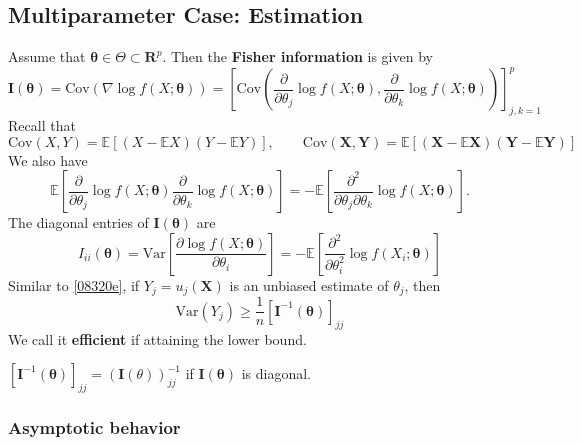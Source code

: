 \subsection{Multiparameter Case: Estimation}

Assume that $\boldsymbol{\theta}\in\Theta \subset \mathbf{R}^{p}$. Then the \textbf{Fisher information} is given by
\[
\mathbf{I}(\boldsymbol{\theta})=\mathrm{Cov}(\nabla \log f(X;\boldsymbol{\theta}))=\left[ \mathrm{Cov}\left( \frac{ \partial   }{ \partial \theta _j } \log f(X;\boldsymbol{\theta}),\frac{ \partial   }{ \partial \theta _k } \log f(X;\boldsymbol{\theta}) \right) \right]_{j,k=1}^{p}
\]
Recall that
\[
\mathrm{Cov}(X,Y)=\mathbb{E}[(X-\mathbb{E}X)(Y-\mathbb{E}Y)],\qquad \mathrm{Cov}(\mathbf{X},\mathbf{Y})=\mathbb{E}[(\mathbf{X}-\mathbb{E}\mathbf{X})(\mathbf{Y}-\mathbb{E}\mathbf{Y})]
\]
We also have
\[
\mathbb{E}\left[\frac{\partial}{\partial \theta_j} \log f(X ; \boldsymbol{\theta}) \frac{\partial}{\partial \theta_k} \log f(X ; \boldsymbol{\theta})\right]=-\mathbb{E}\left[\frac{\partial^2}{\partial \theta_j \partial \theta_k} \log f(X ; \boldsymbol{\theta})\right] .
\]
The diagonal entries of $\mathbf{I}(\boldsymbol{\theta})$ are
\[
I_{ii}(\boldsymbol{\theta})=\mathrm{Var}\left[ \frac{ \partial \log f(X;\boldsymbol{\theta}) }{ \partial \theta _i }  \right]=-\mathbb{E}\left[ \frac{ \partial^2   }{ \partial \theta _i^2 }\log f(X_i;\boldsymbol{\theta})  \right]
\]
Similar to \cref{08320e}, if $Y_j=u_j(\mathbf{X})$ is an unbiased estimate of $\theta _j$, then
\[
\mathrm{Var}(Y_j)\geq \frac{1}{n}[\mathbf{I}^{-1}(\boldsymbol{\theta})]_{jj}
\]
We call it \textbf{efficient} if attaining the lower bound.

\begin{note}
$[\mathbf{I}^{-1}(\boldsymbol{\theta})]_{jj}=(\mathbf{I}(\theta))_{jj}^{-1}$ if $\mathbf{I}(\boldsymbol{\theta})$ is diagonal.
\end{note}
\subsubsection{Asymptotic behavior}


